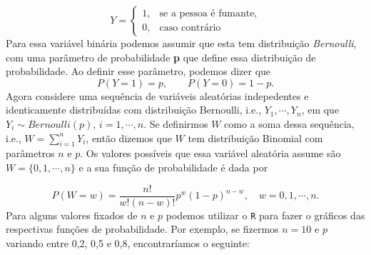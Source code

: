 \documentclass[]{book}
\begin{document}
\[
Y = \begin{cases}
1, & \mbox{se a pessoa é fumante}, \\
0, & \mbox{caso contrário}
    \end{cases}
\]
Para essa variável binária podemos assumir que esta tem distribuição \emph{Bernoulli}, com uma parâmetro de probabilidade \textbf{p} que define essa distribuição de probabilidade. Ao definir esse parâmetro, podemos dizer que
\[
P(Y = 1) = p, \quad \quad P(Y = 0) = 1 - p.
\]
Agora considere uma sequência de variáveis aleatórias indepedentes e identicamente distribuídas com distribuição Bernoulli, i.e., \(Y_1, \cdots, Y_n\), em que \(Y_i \sim Bernoulli(p)\), \(i = 1, \cdots, n\). Se definirmos \(W\) como a soma dessa sequência, i.e., \(W = \sum_{i=1}^n Y_i\), então dizemos que \(W\) tem distribuição Binomial com parâmetros \(n\) e \(p\). Os valores possíveis que essa variável aleatória assume são \(W = \{0, 1, \cdots, n\}\) e a sua função de probabilidade é dada por

\[
P(W = w) = \frac{n!}{w!(n-w)!} p^w (1-p)^{n-w}, \quad w = 0, 1, \cdots, n.
\]
Para alguns valores fixados de \(n\) e \(p\) podemos utilizar o \texttt{R} para fazer o gráficos das respectivas funções de probabilidade. Por exemplo, se fizermos \(n = 10\) e \(p\) variando entre 0,2, 0,5 e 0,8, encontraríamos o seguinte:
\end{document}
